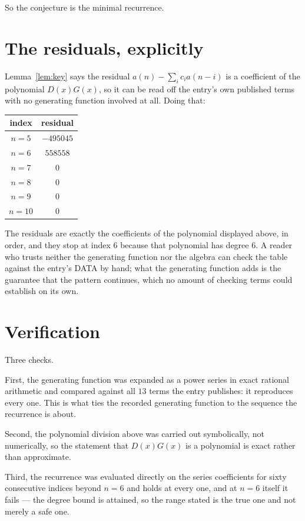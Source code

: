 \documentclass[11pt,a4paper]{article}
\theoremstyle{plain}
\theoremstyle{definition}
\begin{document}
So the conjecture is the minimal recurrence.

\section{The residuals, explicitly}

Lemma~\ref{lem:key} says the residual $a(n)-\sum_ic_ia(n-i)$ is a coefficient of the
polynomial $D(x)G(x)$, so it can be read off the entry's own published terms with no
generating function involved at all. Doing that:
\begin{center}
\begin{tabular}{cc}
index & residual \\ \hline
$n=5$ & $-495045$ \\
$n=6$ & $558558$ \\
$n=7$ & $0$ \\
$n=8$ & $0$ \\
$n=9$ & $0$ \\
$n=10$ & $0$
\end{tabular}
\end{center}
The residuals are exactly the coefficients of the polynomial displayed above, in order, and
they stop at index $6$ because that polynomial has degree $6$. A reader who trusts
neither the generating function nor the algebra can check the table against the entry's DATA
by hand; what the generating function adds is the guarantee that the pattern continues, which
no amount of checking terms could establish on its own.

\section{Verification}

Three checks.

First, the generating function was expanded as a power series in exact rational arithmetic and
compared against all $13$ terms the entry publishes: it reproduces every one. This is
what ties the recorded generating function to the sequence the recurrence is about.

Second, the polynomial division above was carried out symbolically, not numerically, so the
statement that $D(x)G(x)$ is a polynomial is exact rather than approximate.

Third, the recurrence was evaluated directly on the series coefficients for sixty consecutive
indices beyond $n=6$ and holds at every one, and at $n=6$ itself it fails --- the
degree bound is attained, so the range stated is the true one and not merely a safe one.
\end{document}

